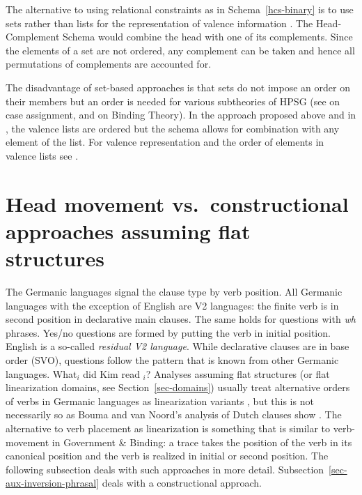 \documentclass[output=paper]{langsci/langscibook}
\begin{document}
The alternative to using relational constraints as in Schema~\ref{hcs-binary} is to use sets rather
than lists for the representation of valence information
\citep*{Gunji86a,HN89a,Pollard90a,EEU92a}. The Head-Complement Schema would combine the head with
one of its complements. Since the elements of a set are not ordered, any complement can be taken and
hence all permutations of complements are accounted for.

The disadvantage of set-based approaches is that sets do
not impose an order on their members but an order is needed for various subtheories of HPSG (see
 on case assignment, and  on Binding Theory). In
the approach proposed above and in , the valence lists are
ordered but the schema allows for combination with any element of the list. For valence
representation and the order of elements in valence lists see .






\section{Head movement vs.\ constructional approaches assuming flat structures}
\label{sec-head-movement}

The Germanic languages signal the clause type by verb position. All Germanic languages with the
exception of English are V2 languages: the finite verb is in second position in declarative main
clauses. The same holds for questions with \emph{wh} phrases. Yes/no questions are formed by putting
the verb in initial position. English is a so-called \emph{residual V2 language}. While declarative
clauses are in base order (SVO), questions follow the pattern that is known from other Germanic
languages.
\ea
What$_i$ did Kim read \trace$_i$? 
\z
Analyses assuming flat structures (or flat linearization domains, see Section~\ref{sec-domains})
usually treat alternative orders of verbs in Germanic languages as linearization variants
\citep{Reape94a,Kathol2001a,Mueller95c,Mueller2003a,TBjerre2006a}, but this is not necessarily so as
Bouma and van Noord's analysis of Dutch clauses show \citep[, 71]{BvN98}. The alternative to
verb placement as linearization is something that is similar to verb-movement in Government \&
Binding: a trace takes the position of the verb in its canonical position and the verb is realized
in initial or second position. The following subsection deals with such approaches in more
detail. Subsection~\ref{sec-aux-inversion-phrasal} deals with a constructional approach.
\end{document}
